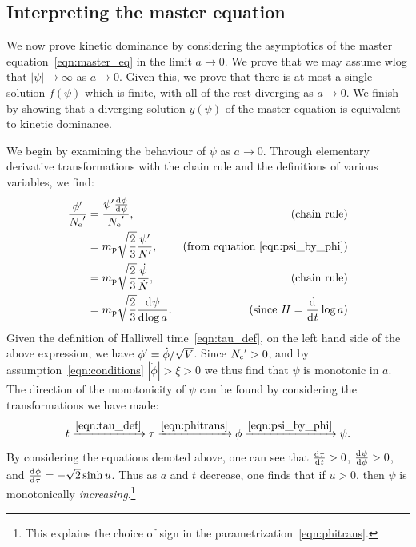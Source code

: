\subsection{Interpreting the master equation}
\label{sec:interpreting_the_master_equation}

We now prove kinetic dominance by considering the asymptotics of the master equation~\eqref{eqn:master_eq} in the limit \(a\rightarrow0\). We prove that we may assume wlog that \(|\psi|\to\infty\) as \(a\to 0\). Given this, we prove that there is at most a single solution \(f(\psi)\) which is finite, with all of the rest diverging as \(a\rightarrow0\). We finish by showing that a diverging solution \(y(\psi)\) of the master equation is equivalent to kinetic dominance.

We begin by examining the behaviour of \(\psi\) as \(a\rightarrow0\). Through elementary derivative transformations with the chain rule and the definitions of various variables, we find:
\begin{align}
  \frac{{{\phi}^\prime}}{{{N_\mathrm{e}}^\prime}} 
  &=
  \frac{{{\psi}^\prime}\frac{\operatorname{d}^{}\!{\phi}}{\operatorname{d}^{}\!{\psi}}}{{{N_\mathrm{e}}^\prime}},
  &\text{(chain rule)} 
  \nonumber
  \\
  &=
  m_{\mathrm{p}}\sqrt{\frac{2}{3}}\frac{{{\psi}^\prime}}{{{N}^\prime}},  
  &\text{(from equation \protect\ref{eqn:psi_by_phi})} 
  \nonumber
  \\
  &=
  m_{\mathrm{p}}\sqrt{\frac{2}{3}}\frac{\dot\psi}{\dot{N}},  
  &\text{(chain rule)} 
  \nonumber
  \\
  &=
  m_{\mathrm{p}}\sqrt{\frac{2}{3}}\frac{\operatorname{d}^{}\!{\psi}}{\operatorname{d}^{}\!{\log a}}.
  &\text{(since \(H=\frac{\operatorname{d}^{}\!{}}{\operatorname{d}^{}\!{t}}\log a\))}
  \label{eqn:div_psi}
\end{align}
Given the definition of Halliwell time~\eqref{eqn:tau_def}, on the left hand side of the above expression, we have \({{\phi}^\prime} = \dot\phi/\sqrt{V}\). Since \({{N_\mathrm{e}}^\prime}>0\), and by assumption~\eqref{eqn:conditions} \({|\dot\phi|>\xi>0}\) we thus find that \(\psi\) is monotonic in \(a\).
The direction of the monotonicity of \(\psi\) can be found by considering the transformations we have made: %
\begin{equation}
  t
  \xrightarrow{\protect\eqref{eqn:tau_def}}
  \tau
  \xrightarrow{\protect\eqref{eqn:phitrans}}
  \phi
  \xrightarrow{\protect\eqref{eqn:psi_by_phi}}
  \psi.
\end{equation}
By considering the equations denoted above, one can see that \(\frac{\operatorname{d}^{}\!{\tau}}{\operatorname{d}^{}\!{t}}>0\), \(\frac{\operatorname{d}^{}\!{\psi}}{\operatorname{d}^{}\!{\phi}}>0\), and \(\frac{\operatorname{d}^{}\!{\phi}}{\operatorname{d}^{}\!{\tau}} = -\sqrt{2}\sinh u\). Thus as \(a\) and \(t\) decrease, one finds that if \(u>0\), then \(\psi\) is monotonically {\em increasing}.\footnote{This explains the choice of sign in the parametrization~\protect\eqref{eqn:phitrans}.}
